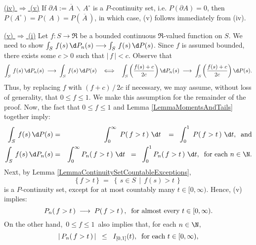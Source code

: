 \mbox{}
\vskip 0.3cm
\noindent
\underline{(iv) $\Longrightarrow$ (v)}
\vskip 0.2cm
\noindent
If $\partial A := \overline{A}\,\backslash\,A^{\circ}$ is a $P$-continuity set,
i.e. $P\!\left(\partial A\right) = 0$, then
$P\!\left(A^{\circ}\right) = P\!\left(\,A\,\right) = P\!\left(\,\overline{A}\,\right)$,
in which case, (v) follows immediately from (iv).

\vskip 0.8cm
\noindent
\underline{(v) $\Longrightarrow$ (i)}
\vskip 0.2cm
\noindent
Let $f : S \longrightarrow \Re$ be a bounded continuous $\Re$-valued function on $S$.
We need to show $\int_{S}\,f(s)\,\d P_{n}(s) \longrightarrow \int_{S}\,f(s)\,\d P(s)$.
Since $f$ is assumed bounded, there exists some $c > 0$ such that $\vert\,f\,\vert < c$.
Observe that
\begin{equation*}
\int_{S}\,f(s)\,\d P_{n}(s) \;\longrightarrow\; \int_{S}\,f(s)\,\d P(s)
\quad\Longleftrightarrow\quad
\int_{S}\left(\dfrac{f(s)+c}{2 c}\right)\d P_{n}(s) \;\longrightarrow\; \int_{S}\left(\dfrac{f(s)+c}{2 c}\right)\d P(s).
\end{equation*}
Thus, by replacing $f$ with $(f + c)\,/\,2c$ if necessary, we may assume, without loss of generality, that $0 \leq f \leq 1$.
We make this assumption for the remainder of the proof.
\vskip 0.2cm
\noindent
Now, the fact that $0 \leq f \leq 1$ and Lemma \ref{LemmaMomentsAndTails}
together imply:
\begin{eqnarray*}
\int_{S}\,f(s)\,\d P(s)
&=& \int_{0}^{\infty}\;P\!\left(\,f > t\,\right)\,\d t\;\mbox{}
\;\;=\;\; \int_{0}^{1}\;P\!\left(\,f > t\,\right)\,\d t,
\;\;\textnormal{and}
\\
\int_{S}\,f(s)\,\d P_{n}(s)
&=& \int_{0}^{\infty}P_{n}\!\left(\,f > t\,\right)\,\d t
\;\;=\;\; \int_{0}^{1}P_{n}\!\left(\,f > t\,\right)\,\d t,
\;\;\textnormal{for each $n \in \N$}.
\end{eqnarray*}
Next, by Lemma \ref{LemmaContinuitySetCountableExceptions},
\begin{equation*}
\{\,f > t\,\}
\;=\;\left\{\, s \in S \;\,\vert\;\, f(s) > t \,\right\}
\end{equation*}
is a $P$-continuity set, except for at most countably many $t \in [0,\infty)$.
Hence, (v) implies:
\begin{equation*}
P_{n}\!\left(\,f > t\,\right) \;\longrightarrow\; P\!\left(\,f > t\,\right),
\;\;\textnormal{for almost every $t \in [0,\infty)$}.
\end{equation*}
On the other hand, \,$0 \leq f \leq 1$\, also implies that, for each $n \in \N$,
\begin{equation*}
\left\vert\,P_{n}\!\left(\,f > t\,\right)\,\right\vert
\;\;\leq\;\; I_{[0,1]}(t),
\;\;\textnormal{for each $t \in [0,\infty)$},
\end{equation*}
